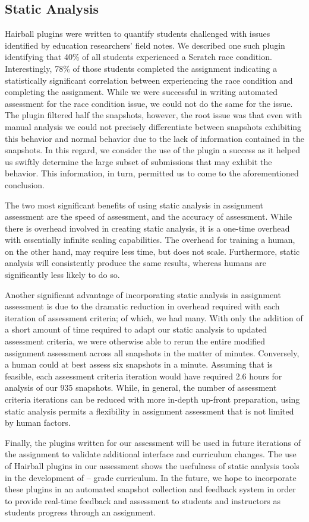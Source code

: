 \subsection{Static Analysis}
Hairball plugins were written to quantify students challenged with issues
identified by education researchers' field notes. We described one such plugin
identifying that 40\% of all students experienced a Scratch race
condition. Interestingly, 78\% of those students completed the assignment
indicating a statistically significant correlation between experiencing the
race condition and completing the assignment. While we were successful in
writing automated assessment for the race condition issue, we could not do the
same for the \dce{} issue. The plugin filtered half the snapshots, however, the
root issue was that even with manual analysis we could not precisely
differentiate between snapshots exhibiting this behavior and normal behavior
due to the lack of information contained in the snapshots. In this regard, we
consider the use of the plugin a success as it helped us swiftly determine the
large subset of submissions that may exhibit the \dce{} behavior. This
information, in turn, permitted us to come to the aforementioned conclusion.

The two most significant benefits of using static analysis in assignment
assessment are the speed of assessment, and the accuracy of assessment. While
there is overhead involved in creating static analysis, it is a one-time
overhead with essentially infinite scaling capabilities. The overhead for
training a human, on the other hand, may require less time, but does not
scale. Furthermore, static analysis will consistently produce the same results,
whereas humans are significantly less likely to do so.

Another significant advantage of incorporating static analysis in assignment
assessment is due to the dramatic reduction in overhead required with each
iteration of assessment criteria; of which, we had many. With only the addition
of a short amount of time required to adapt our static analysis to updated
assessment criteria, we were otherwise able to rerun the entire modified
assignment assessment across all snapshots in the matter of
minutes. Conversely, a human could at best assess six snapshots in a
minute. Assuming that is feasible, each assessment criteria iteration would
have required 2.6 hours for analysis of our 935 snapshots. While, in general,
the number of assessment criteria iterations can be reduced with more in-depth
up-front preparation, using static analysis permits a flexibility in assignment
assessment that is not limited by human factors.

Finally, the plugins written for our assessment will be used in future
iterations of the assignment to validate additional interface and curriculum
changes. The use of Hairball plugins in our assessment shows the usefulness of
static analysis tools in the development of -- grade
curriculum. In the future, we hope to incorporate these plugins in an automated
snapshot collection and feedback system in order to provide real-time feedback
and assessment to students and instructors as students progress through an
assignment.
